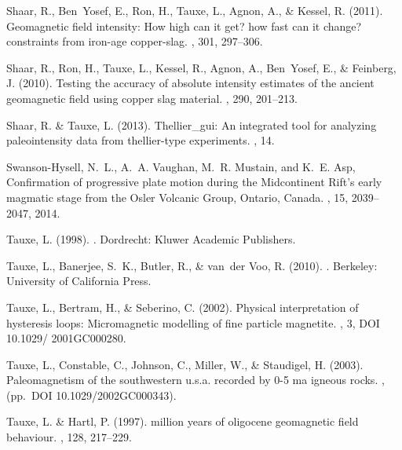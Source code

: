 \documentclass[11pt]{book}
\begin{document}
{{{\begin{thebibliography}{}
Shaar, R., Ben~Yosef, E., Ron, H., Tauxe, L., Agnon, A., \& Kessel, R. (2011).
\newblock Geomagnetic field intensity: How high can it get? how fast can it
  change? constraints from iron-age copper-slag.
, 301, 297--306.

Shaar, R., Ron, H., Tauxe, L., Kessel, R., Agnon, A., Ben~Yosef, E., \&
  Feinberg, J. (2010).
\newblock Testing the accuracy of absolute intensity estimates of the ancient
  geomagnetic field using copper slag material.
, 290, 201--213.

Shaar, R. \& Tauxe, L. (2013).
\newblock Thellier\_gui: An integrated tool for analyzing paleointensity data
  from thellier-type experiments.
, 14.

Swanson-Hysell, N.~L., A.~A. Vaughan, M.~R. Mustain, and K.~E. Asp,
\newblock Confirmation of progressive plate motion during the Midcontinent Rift's early
  magmatic stage from the Osler Volcanic Group, Ontario, Canada.
  , 15, 2039--2047, 2014.

Tauxe, L. (1998).
.
\newblock Dordrecht: Kluwer Academic Publishers.

Tauxe, L., Banerjee, S.~K., Butler, R., \& van~der Voo, R. (2010).
.
\newblock Berkeley: University of California Press.

Tauxe, L., Bertram, H., \& Seberino, C. (2002).
\newblock Physical interpretation of hysteresis loops: Micromagnetic modelling
  of fine particle magnetite.
, 3, DOI 10.1029/ 2001GC000280.

Tauxe, L., Constable, C., Johnson, C., Miller, W., \& Staudigel, H. (2003).
\newblock Paleomagnetism of the southwestern u.s.a. recorded by 0-5 ma igneous
  rocks.
, (pp.\ DOI 10.1029/2002GC000343).

Tauxe, L. \& Hartl, P. (1997).
 million years of oligocene geomagnetic field behaviour.
, 128, 217--229.


\end{thebibliography}}}}
\end{document}
